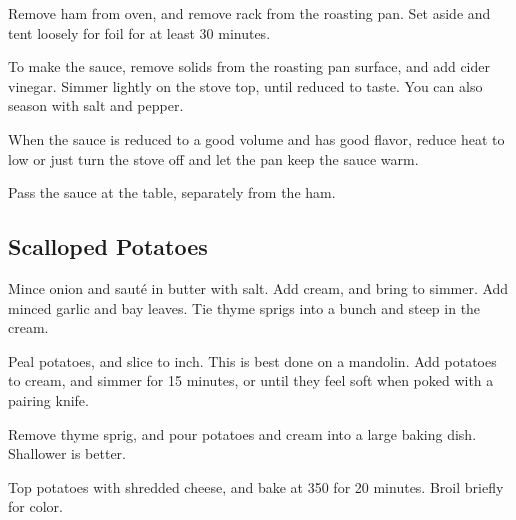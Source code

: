 \begin{recipe}
Remove ham from oven, and remove rack from the roasting pan. Set aside and tent loosely for foil for at least 30 minutes.

To make the sauce, remove solids from the roasting pan surface, and add cider vinegar. Simmer lightly on the stove top, until reduced to taste. You can also season with salt and pepper.

When the sauce is reduced to a good volume and has good flavor, reduce heat to low or just turn the stove off and let the pan keep the sauce warm.

Pass the sauce at the table, separately from the ham.

\subsection{Scalloped Potatoes}



Mince onion and sauté in butter with salt. Add cream, and bring to simmer. Add minced garlic and bay leaves. Tie thyme sprigs into a bunch and steep in the cream.


Peal potatoes, and slice to  inch. This is best done on a mandolin. Add potatoes to cream, and simmer for 15 minutes, or until they feel soft when poked with a pairing knife.

Remove thyme sprig, and pour potatoes and cream into a large baking dish. Shallower is better.


Top potatoes with shredded cheese, and bake at 350\degree{} for 20 minutes. Broil briefly for color.

\end{recipe}
